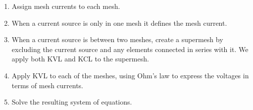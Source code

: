 \documentclass{article}
\begin{document}
    \begin{enumerate}
        \item Assign mesh currents to each mesh.
        \item When a current source is only in one mesh it defines the mesh current.
        \item When a current source is between two meshes, create a supermesh by excluding the current source and any elements connected in series with it.
        We apply both KVL and KCL to the supermesh.
        \item Apply KVL to each of the meshes, using Ohm's law to express the voltages in terms of mesh currents.
        \item Solve the resulting system of equations.
    \end{enumerate}
\end{document}
